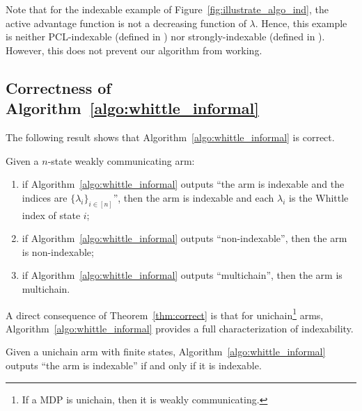 \noindent Note that for the indexable example of Figure~\ref{fig:illustrate_algo_ind}, the active advantage function is not a decreasing function of $\lambda$. Hence, this example is neither PCL-indexable (defined in \cite[Definition~3]{nino2020fast}) nor strongly-indexable (defined in \cite{nakhleh2021neurwin}). However, this does not prevent our algorithm from working. 

\subsection{Correctness of Algorithm~\ref{algo:whittle_informal}}

The following result shows that Algorithm~\ref{algo:whittle_informal} is correct.

\begin{thm}
    \label{thm:correct}
    Given a $n$-state weakly communicating arm:
    \begin{enumerate}[label=(\roman*)]
        \item \label{it:idx_proof} if Algorithm~\ref{algo:whittle_informal} outputs ``the arm is indexable and the indices are $\{\lambda_i\}_{i\in[n]}$'', then the arm is indexable and each $\lambda_i$ is the Whittle index of state $i$;
        \item \label{it:non_idx_proof} if Algorithm~\ref{algo:whittle_informal} outputs ``non-indexable'', then the arm is non-indexable;
        \item \label{it:multi_chain} if Algorithm~\ref{algo:whittle_informal} outputs ``multichain'', then the arm is multichain.
    \end{enumerate}
\end{thm}
A direct consequence of Theorem~\ref{thm:correct} is that for unichain\footnote{If a MDP is unichain, then it is weakly communicating.} arms, Algorithm~\ref{algo:whittle_informal} provides a full characterization of indexability. 
\begin{cor}
    \label{coro:correct_unichain}
    Given a unichain arm with finite states, Algorithm~\ref{algo:whittle_informal} outputs ``the arm is indexable'' if and only if it is indexable. 
\end{cor}

